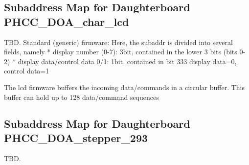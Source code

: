 \documentclass[11pt]{scrartcl}
\begin{document}
\subsection{Subaddress Map for Daughterboard PHCC\_DOA\_char\_lcd}

TBD.
Standard (generic) firmware:
Here, the subaddr is divided into several fields, namely
* display number (0-7): 3bit, contained in the lower 3 bits (bits 0-2)
* display data/control data 0/1: 1bit, contained in bit 333 
  display data=0, control data=1

The lcd firmware buffers the incoming data/commands in a circular buffer.
This buffer can hold up to 128 data/command sequences


\subsection{Subaddress Map for Daughterboard PHCC\_DOA\_stepper\_293}

TBD.
\end{document}
